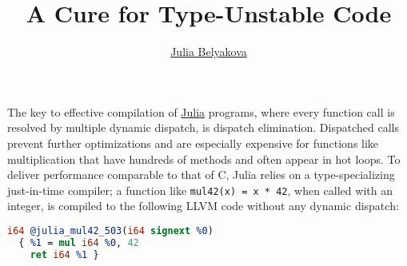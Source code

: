 \documentclass[twocolumn]{article}
\title{A Cure for Type-Unstable Code}\label{a-cure-for-type-unstable-code}
\author{\href{https://julbinb.github.io/}{Julia Belyakova}}
\date{}%
\begin{document}
\maketitle




The key to effective compilation of \href{https://julialang.org/}{Julia}
programs, where every function call is resolved by multiple dynamic dispatch,
is dispatch elimination.
Dispatched calls prevent further optimizations and are especially expensive
for functions like multiplication that have hundreds of methods
and often appear in hot loops.
To deliver performance comparable to that of C, Julia relies on
a type-specializing just-in-time compiler; a function like
\texttt{mul42(x)\ =\ x\ *\ 42},
when called with an integer, is compiled to the following
LLVM code without any dynamic dispatch:
\begin{lstlisting}[language=LLVM]
  i64 @julia_mul42_503(i64 signext %0) 
  { %1 = mul i64 %0, 42
    ret i64 %1 }
\end{lstlisting}

\end{document}
